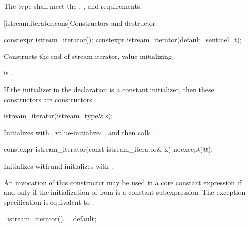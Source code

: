 \pnum
The type  shall meet the ,
, and  requirements.

[istream.iterator.cons]{Constructors and destructor}

%
\begin{itemdecl}
constexpr istream_iterator();
constexpr istream_iterator(default_sentinel_t);
\end{itemdecl}

\begin{itemdescr}
\pnum
\effects
Constructs the end-of-stream iterator, value-initializing .

\pnum
\ensures
{} is .

\pnum
\remarks
If the initializer  in the declaration 
is a constant initializer,
then these constructors are  constructors.
\end{itemdescr}


%
\begin{itemdecl}
istream_iterator(istream_type& s);
\end{itemdecl}

\begin{itemdescr}
\pnum
\effects
Initializes  with ,
value-initializes ,
and then calls .
\end{itemdescr}


%
\begin{itemdecl}
constexpr istream_iterator(const istream_iterator& x) noexcept(@\seebelow@);
\end{itemdecl}

\begin{itemdescr}
\pnum
\effects
Initializes  with  and
initializes  with .

\pnum
\remarks
An invocation of this constructor may be used in a core constant expression
if and only if the initialization of  from 
is a constant subexpression.
The exception specification is equivalent to
.
\end{itemdescr}

%
\begin{itemdecl}
~istream_iterator() = default;
\end{itemdecl}

